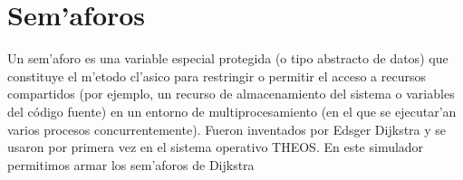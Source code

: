 \section{Sem'aforos}
Un sem'aforo es una variable especial protegida (o tipo abstracto de datos) que constituye el m'etodo cl'asico para restringir o permitir el acceso a recursos compartidos (por ejemplo, un recurso de almacenamiento del sistema o variables del código fuente) en un entorno de multiprocesamiento (en el que se ejecutar'an varios procesos concurrentemente). Fueron inventados por Edsger Dijkstra y se usaron por primera vez en el sistema operativo THEOS.
En este simulador permitimos armar los sem'aforos de Dijkstra 

